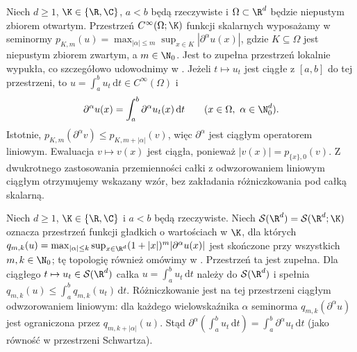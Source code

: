 \begin{przyklad}
\label{ex:c-infty-integral15a}
Niech $d\ge1$, $\K\in\{\R,\C\}$, $a<b$ będą rzeczywiste
i $\Omega\subset\R^d$ będzie niepustym zbiorem otwartym.
Przestrzeń $C^\infty(\Omega;\K)$ funkcji skalarnych
wyposażamy w seminormy
$p_{K,m}(u)=\max_{|\alpha|\le m}\sup_{x\in K}|\partial^\alpha u(x)|$,
gdzie $K\subseteq\Omega$ jest niepustym zbiorem zwartym,
a $m\in\N_0$.
Jest to zupełna przestrzeń lokalnie wypukła, co szczegółowo
udowodnimy w . Jeżeli $t\mapsto u_t$ jest
ciągłe z $[a,b]$ do tej przestrzeni, to
$u=\int_a^b u_t\,\mathrm dt\in C^\infty(\Omega)$ i
\[
 \partial^\alpha u(x)
 =\int_a^b\partial^\alpha u_t(x)\,\mathrm dt
 \qquad(x\in\Omega,\ \alpha\in\N_0^d).
\]
Istotnie, $p_{K,m}(\partial^\alpha v)\le p_{K,m+|\alpha|}(v)$,
więc $\partial^\alpha$ jest ciągłym operatorem liniowym.
Ewaluacja $v\mapsto v(x)$ jest ciągła, ponieważ
$|v(x)|=p_{\{x\},0}(v)$. Z dwukrotnego zastosowania
przemienności całki z odwzorowaniem liniowym ciągłym
otrzymujemy wskazany wzór, bez zakładania różniczkowania
pod całką skalarną.
\end{przyklad}

\begin{przyklad}
\label{ex:schwartz-integral15a}
Niech $d\ge1$, $\K\in\{\R,\C\}$ i $a<b$ będą rzeczywiste.
Niech $\mathcal S(\R^d)=\mathcal S(\R^d;\K)$ oznacza
przestrzeń funkcji gładkich o wartościach w $\K$,
dla których $q_{m,k}(u)=\max_{|\alpha|\le k}\sup_{x\in\R^d}
(1+|x|)^m|\partial^\alpha u(x)|$ jest skończone
przy wszystkich $m,k\in\N_0$; tę topologię również
omówimy w . Przestrzeń ta jest zupełna.
Dla ciągłego $t\mapsto u_t\in\mathcal S(\R^d)$ całka
$u=\int_a^b u_t\,\mathrm dt$ należy do $\mathcal S(\R^d)$
i spełnia $q_{m,k}(u)\le\int_a^b q_{m,k}(u_t)\,\mathrm dt$.
Różniczkowanie jest na tej przestrzeni ciągłym
odwzorowaniem liniowym: dla każdego wielowskaźnika $\alpha$
seminorma $q_{m,k}(\partial^\alpha u)$ jest ograniczona
przez $q_{m,k+|\alpha|}(u)$. Stąd
$\partial^\alpha(\int_a^b u_t\,\mathrm dt)
=\int_a^b\partial^\alpha u_t\,\mathrm dt$
(jako równość w przestrzeni Schwartza).
\end{przyklad}

